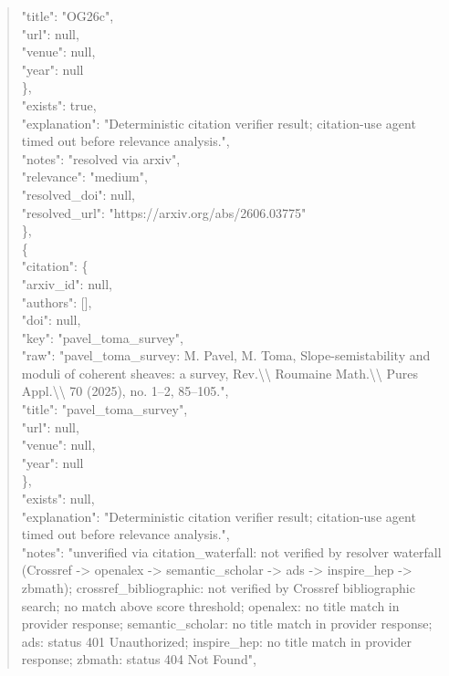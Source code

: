\documentclass[11pt]{article}
\begin{document}
\begin{quote}
        "title": "OG26c",\\
        "url": null,\\
        "venue": null,\\
        "year": null\\
      \},\\
      "exists": true,\\
      "explanation": "Deterministic citation verifier result; citation-use agent timed out before relevance analysis.",\\
      "notes": "resolved via arxiv",\\
      "relevance": "medium",\\
      "resolved\_doi": null,\\
      "resolved\_url": "https://arxiv.org/abs/2606.03775"\\
    \},\\
    \{\\
      "citation": \{\\
        "arxiv\_id": null,\\
        "authors": [],\\
        "doi": null,\\
        "key": "pavel\_toma\_survey",\\
        "raw": "pavel\_toma\_survey: M. Pavel, M. Toma, Slope-semistability and moduli of coherent sheaves: a survey, Rev.\textbackslash{}\textbackslash{} Roumaine Math.\textbackslash{}\textbackslash{} Pures Appl.\textbackslash{}\textbackslash{} 70 (2025), no. 1--2, 85--105.",\\
        "title": "pavel\_toma\_survey",\\
        "url": null,\\
        "venue": null,\\
        "year": null\\
      \},\\
      "exists": null,\\
      "explanation": "Deterministic citation verifier result; citation-use agent timed out before relevance analysis.",\\
      "notes": "unverified via citation\_waterfall: not verified by resolver waterfall (Crossref -> openalex -> semantic\_scholar -> ads -> inspire\_hep -> zbmath); crossref\_bibliographic: not verified by Crossref bibliographic search; no match above score threshold; openalex: no title match in provider response; semantic\_scholar: no title match in provider response; ads: status 401 Unauthorized; inspire\_hep: no title match in provider response; zbmath: status 404 Not Found",\\

\end{quote}
\end{document}
